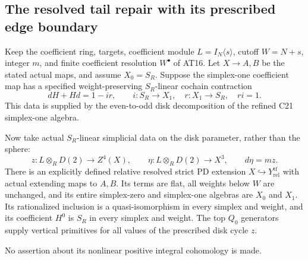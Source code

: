 \subsection{The resolved tail repair with its prescribed edge boundary}

\begin{theorem}
\label{AT17}
Keep the coefficient ring, targets, coefficient module
$L=I_N\langle s\rangle$, cutoff $W=N+s$, integer $m$,
and finite coefficient resolution $W^\bullet$ of AT16.
Let $X\to A,B$ be the stated actual maps, and assume
$X_0=S_R$. Suppose the simplex-one coefficient map
has a specified weight-preserving $S_R$-linear cochain
contraction
\[
 dH+Hd=1-ir,\qquad
 i:S_R\to X_1,\quad r:X_1\to S_R,\quad ri=1.
 \tag{AT.83}
\]
This data is supplied by the even-to-odd disk
decomposition of the refined C21 simplex-one algebra.

Now take actual $S_R$-linear simplicial data on
the disk parameter, rather than the sphere:
\[
 z:L\otimes_R D(2)\to Z^4(X),\qquad
 \eta:L\otimes_R D(2)\to X^3,\qquad d\eta=mz.
 \tag{AT.84}
\]
There is an explicitly defined relative resolved
strict PD extension $X\hookrightarrow Y_{\mathrm{rel}}^{\mathrm{tf}}$
with actual extending maps to $A,B$.
Its terms are flat, all weights below $W$ are
unchanged, and its entire simplex-zero and
simplex-one algebras are $X_0$ and $X_1$.
Its rationalized inclusion is a quasi-isomorphism
in every simplex and weight, and its coefficient
$H^0$ is $S_R$ in every simplex and weight.
The top $Q_0$ generators supply vertical primitives
for all values of the prescribed disk cycle $z$.

No assertion about its nonlinear positive integral
cohomology is made.
\end{theorem}

